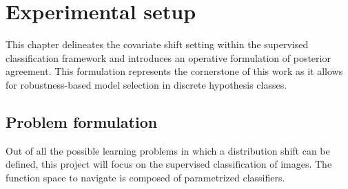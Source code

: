\chapter{Experimental setup}\label{sec:experimental_setup}

This chapter delineates the covariate shift setting within the 
supervised classification framework and introduces an operative
formulation of posterior agreement. This formulation represents 
the cornerstone of this work as it allows for robustness-based
model selection in discrete hypothesis classes.

\section{Problem formulation}

Out of all the possible learning problems in which a distribution shift
can be defined, this project will focus on the supervised classification
of images. The function space to navigate is composed of parametrized
classifiers.

